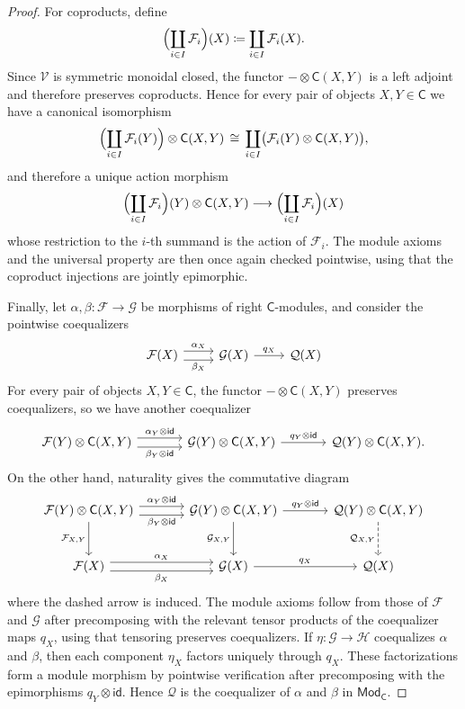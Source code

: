 \documentclass[11pt,onecolumn]{article}
\newcommand{\id}{\mathsf{id}}
\newcommand{\cV}{\mathscr{V}}
\newcommand{\cC}{\mathsf{C}}
\newcommand{\Mod}{\mathsf{Mod}}
\theoremstyle{plain}
\theoremstyle{remark}
\theoremstyle{definition}
\begin{document}
\begin{proof}
	For coproducts, define
	\[
		\Bigl(\coprod_{i \in I} \mathcal{F}_i\Bigr)(X) \coloneqq \coprod_{i \in I} \mathcal{F}_i(X).
	\]
	Since $\cV$ is symmetric monoidal closed, the functor $- \otimes \cC(X,Y)$ is a left adjoint and therefore preserves coproducts.
	Hence for every pair of objects $X,Y \in \cC$ we have a canonical isomorphism
	\[
		\Bigl(\coprod_{i \in I} \mathcal{F}_i(Y)\Bigr) \otimes \cC(X,Y)
		\,\cong\,
		\coprod_{i \in I} \bigl(\mathcal{F}_i(Y) \otimes \cC(X,Y)\bigr),
	\]
	and therefore a unique action morphism
	\[
		\Bigl(\coprod_{i \in I} \mathcal{F}_i\Bigr)(Y) \otimes \cC(X,Y)
		\longrightarrow
		\Bigl(\coprod_{i \in I} \mathcal{F}_i\Bigr)(X)
	\]
	whose restriction to the $i$-th summand is the action of $\mathcal{F}_i$.
	The module axioms and the universal property are then once again checked pointwise, using that the coproduct injections are jointly epimorphic.

	Finally, let $\alpha,\beta \colon \mathcal{F} \to \mathcal{G}$ be morphisms of right $\cC$-modules, and consider the pointwise coequalizers
	\[
		\begin{tikzcd}
			\mathcal{F}(X) \ar[r, shift left=1.5, "\alpha_X"] \ar[r, shift right=1.5, "\beta_X"'] & \mathcal{G}(X) \ar[r, "q_X"] & \mathcal{Q}(X)
		\end{tikzcd}
	\]
	For every pair of objects $X,Y \in \cC$, the functor $- \otimes \cC(X,Y)$ preserves coequalizers, so we have another coequalizer
	\[
		\begin{tikzcd}[column sep=large]
			\mathcal{F}(Y) \otimes \cC(X,Y) \ar[r, shift left=1.5, "\alpha_Y \otimes \id"] \ar[r, shift right=1.5, "\beta_Y \otimes \id"'] & \mathcal{G}(Y) \otimes \cC(X,Y) \ar[r, "q_Y \otimes \id"] & \mathcal{Q}(Y) \otimes \cC(X,Y).
		\end{tikzcd}
	\]
	On the other hand, naturality gives the commutative diagram
	\[
		\begin{tikzcd}[column sep=large, row sep=large]
			\mathcal{F}(Y) \otimes \cC(X,Y)
				\ar[d, "\mathcal{F}_{X,Y}"']
				\ar[r, shift left=.8ex, "\alpha_Y \otimes \id"]
				\ar[r, shift right=.8ex, "\beta_Y \otimes \id"']
			&
			\mathcal{G}(Y) \otimes \cC(X,Y)
				\ar[d, "\mathcal{G}_{X,Y}"']
				\ar[r, "q_Y \otimes \id"]
			&
			\mathcal{Q}(Y) \otimes \cC(X,Y)
				\ar[d, dashed, "\mathcal{Q}_{X,Y}"']
			\\
			\mathcal{F}(X)
				\ar[r, shift left=.8ex, "\alpha_X"]
				\ar[r, shift right=.8ex, "\beta_X"']
			&
			\mathcal{G}(X)
				\ar[r, "q_X"]
			&
			\mathcal{Q}(X)
		\end{tikzcd}
	\]
	where the dashed arrow is induced.
	The module axioms follow from those of $\mathcal{F}$ and $\mathcal{G}$ after precomposing with the relevant tensor products of the coequalizer maps $q_X$, using that tensoring preserves coequalizers.
	If $\eta \colon \mathcal{G} \to \mathcal{H}$ coequalizes $\alpha$ and $\beta$, then each component $\eta_X$ factors uniquely through $q_X$.
	These factorizations form a module morphism by pointwise verification after precomposing with the epimorphisms $q_Y \otimes \id$.
	Hence $\mathcal{Q}$ is the coequalizer of $\alpha$ and $\beta$ in $\Mod_\cC$.


\end{proof}
\end{document}
